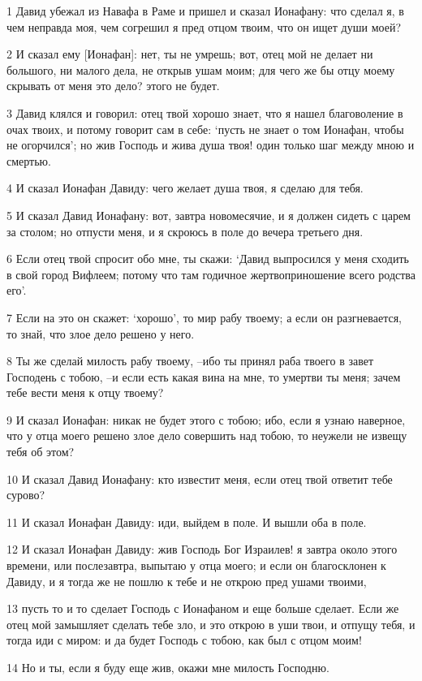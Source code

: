 \par 1 Давид убежал из Навафа в Раме и пришел и сказал Ионафану: что сделал я, в чем неправда моя, чем согрешил я пред отцом твоим, что он ищет души моей?
\par 2 И сказал ему [Ионафан]: нет, ты не умрешь; вот, отец мой не делает ни большого, ни малого дела, не открыв ушам моим; для чего же бы отцу моему скрывать от меня это дело? этого не будет.
\par 3 Давид клялся и говорил: отец твой хорошо знает, что я нашел благоволение в очах твоих, и потому говорит сам в себе: `пусть не знает о том Ионафан, чтобы не огорчился'; но жив Господь и жива душа твоя! один только шаг между мною и смертью.
\par 4 И сказал Ионафан Давиду: чего желает душа твоя, я сделаю для тебя.
\par 5 И сказал Давид Ионафану: вот, завтра новомесячие, и я должен сидеть с царем за столом; но отпусти меня, и я скроюсь в поле до вечера третьего дня.
\par 6 Если отец твой спросит обо мне, ты скажи: `Давид выпросился у меня сходить в свой город Вифлеем; потому что там годичное жертвоприношение всего родства его'.
\par 7 Если на это он скажет: `хорошо', то мир рабу твоему; а если он разгневается, то знай, что злое дело решено у него.
\par 8 Ты же сделай милость рабу твоему, --ибо ты принял раба твоего в завет Господень с тобою, --и если есть какая вина на мне, то умертви ты меня; зачем тебе вести меня к отцу твоему?
\par 9 И сказал Ионафан: никак не будет этого с тобою; ибо, если я узнаю наверное, что у отца моего решено злое дело совершить над тобою, то неужели не извещу тебя об этом?
\par 10 И сказал Давид Ионафану: кто известит меня, если отец твой ответит тебе сурово?
\par 11 И сказал Ионафан Давиду: иди, выйдем в поле. И вышли оба в поле.
\par 12 И сказал Ионафан Давиду: жив Господь Бог Израилев! я завтра около этого времени, или послезавтра, выпытаю у отца моего; и если он благосклонен к Давиду, и я тогда же не пошлю к тебе и не открою пред ушами твоими,
\par 13 пусть то и то сделает Господь с Ионафаном и еще больше сделает. Если же отец мой замышляет сделать тебе зло, и это открою в уши твои, и отпущу тебя, и тогда иди с миром: и да будет Господь с тобою, как был с отцом моим!
\par 14 Но и ты, если я буду еще жив, окажи мне милость Господню.
